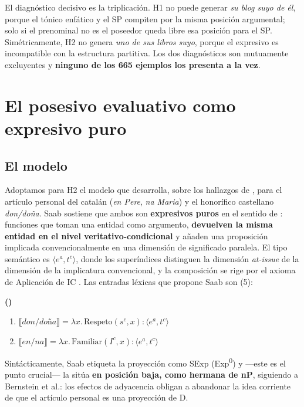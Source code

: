 \documentclass[12pt,a4paper]{article}
\newcommand{\sem}[1]{\ensuremath{\llbracket #1 \rrbracket}}
\newcounter{exnum}
\newenvironment{exe}{%
  \refstepcounter{exnum}%
  \par\medskip\noindent\textbf{(\theexnum)}\quad\ignorespaces
}{%
  \par\medskip
}
\newenvironment{exlist}{%
  \begin{enumerate}[label=\alph*., leftmargin=2.5em, itemsep=4pt, topsep=4pt]
}{%
  \end{enumerate}
}
\begin{document}
El diagnóstico decisivo es la triplicación. H1 no puede generar \textit{su blog suyo de él}, porque el tónico enfático y el SP compiten por la misma posición argumental; solo si el prenominal no es el poseedor queda libre esa posición para el SP. Simétricamente, H2 no genera \textit{uno de sus libros suyo}, porque el expresivo es incompatible con la estructura partitiva. Los dos diagnósticos son mutuamente excluyentes y \textbf{ninguno de los 665 ejemplos los presenta a la vez}.

\section{El posesivo evaluativo como expresivo puro}

\subsection{El modelo}

Adoptamos para H2 el modelo que \textcite{saab2021} desarrolla, sobre los hallazgos de \textcite{bernstein2019}, para el artículo personal del catalán (\textit{en Pere}, \textit{na Maria}) y el honorífico castellano \textit{don/doña}. Saab sostiene que ambos son \textbf{expresivos puros} en el sentido de \textcite{potts2005}: funciones que toman una entidad como argumento, \textbf{devuelven la misma entidad en el nivel veritativo-condicional} y añaden una proposición implicada convencionalmente en una dimensión de significado paralela. El tipo semántico es $\langle e^a, t^c \rangle$, donde los superíndices distinguen la dimensión \textit{at-issue} de la dimensión de la implicatura convencional, y la composición se rige por el axioma de Aplicación de IC \parencite[64]{potts2005}. Las entradas léxicas que propone Saab son (5):

\begin{exe}
\begin{exlist}
\item $\sem{\textit{don/doña}} = \lambda x.\, \text{Respeto}(s^c, x) : \langle e^a, t^c \rangle$ \quad [$s^c$ = hablante del contexto]
\item $\sem{\textit{en/na}} = \lambda x.\, \text{Familiar}(I^c, x) : \langle e^a, t^c \rangle$ \quad [$I^c$ = interlocutores del contexto]
\end{exlist}
\end{exe}

Sintácticamente, Saab etiqueta la proyección como SExp (Exp\textsuperscript{0}) y ---este es el punto crucial--- la sitúa \textbf{en posición baja, como hermana de nP}, siguiendo a Bernstein et al.: los efectos de adyacencia obligan a abandonar la idea corriente de que el artículo personal es una proyección de D.
\end{document}
